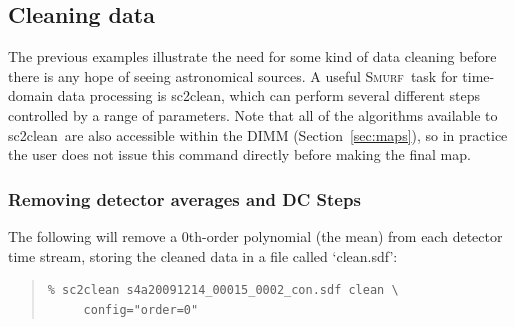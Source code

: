 \documentclass[twoside,11pt]{article}
\newcommand{\xref}[3]{#1}
\newcommand{\xlabel}[1]{}
\renewcommand{\_}{\texttt{\symbol{95}}}
\newenvironment{myquote}{\begin{quote}\begin{small}}{\end{small}\end{quote}}
\newcommand{\smurf}{\xref{\textsc{Smurf}}{sun258}{}}
\newcommand{\task}[1]{\textsf{#1}}
\newcommand{\clean}{\xref{\task{sc2clean}}{sun258}{SC2CLEAN}}
\begin{document}
\subsection{\xlabel{clean}Cleaning data}

The previous examples illustrate the need for some kind of data
cleaning before there is any hope of seeing astronomical sources. A
useful \smurf\ task for time-domain data processing is \clean, which
can perform several different steps controlled by a range of
parameters. Note that all of the algorithms available to \clean\ are
also accessible within the DIMM (Section~\ref{sec:maps}), so in
practice the user does not issue this command directly before making
the final map.

\subsubsection{\xlabel{clean_average}Removing detector averages and DC Steps}

The following will remove a 0th-order polynomial (the mean) from each
detector time stream, storing the cleaned data in a file called
`clean.sdf':

\begin{myquote}
\begin{verbatim}
% sc2clean s4a20091214_00015_0002_con.sdf clean \
     config="order=0"
\end{verbatim}
\end{myquote}
\end{document}
